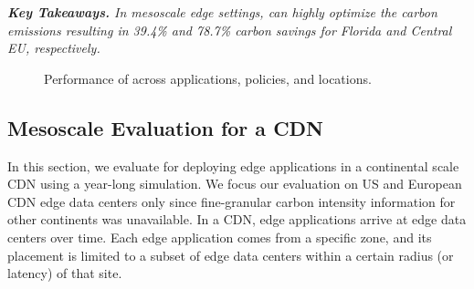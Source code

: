 


\noindent \textit{\textbf{Key Takeaways.} 
In mesoscale edge settings, \proposedsystem can highly optimize the carbon emissions resulting in 39.4\% and 78.7\% carbon savings for Florida and Central EU, respectively. 
}

\begin{figure}[tb]
    \caption{Performance of \proposedsystem across applications, policies, and locations.}
\label{fig:comparion_regions_real}
\end{figure}






\subsection{Mesoscale Evaluation for a CDN}\label{sec:eval_global}
In this section, we evaluate \proposedsystem for deploying edge applications in a continental scale CDN using a year-long simulation. %
We focus our evaluation on US %
and European CDN edge data centers only %
since fine-granular carbon intensity information for other continents was unavailable.  
In a CDN, edge applications arrive at edge data centers over time. Each edge application comes from a specific zone, and its placement is limited to a subset of edge data centers within a certain radius (or latency) of that site.

